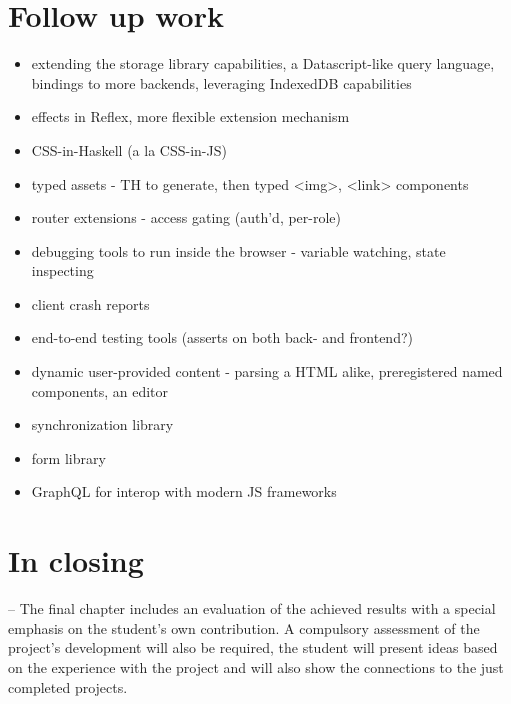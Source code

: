 \documentclass[english,odsaz]{fitthesis}
\begin{document}
\section{Follow up work}
\label{sec:org9b26072}
\begin{itemize}
\item extending the storage library capabilities, a Datascript-like query language,
bindings to more backends, leveraging IndexedDB capabilities
\item effects in Reflex, more flexible extension mechanism
\item CSS-in-Haskell (a la CSS-in-JS)
\item typed assets - TH to generate, then typed <img>, <link> components
\item router extensions - access gating (auth'd, per-role)
\item debugging tools to run inside the browser - variable watching, state inspecting
\item client crash reports
\item end-to-end testing tools (asserts on both back- and frontend?)
\item dynamic user-provided content - parsing a HTML alike, preregistered named
components, an editor
\item synchronization library
\item form library
\item GraphQL for interop with modern JS frameworks
\end{itemize}

\section{In closing}
\label{sec:org7d3e43d}
-- The final chapter includes an evaluation of the achieved results with a special
emphasis on the student's own contribution. A compulsory assessment of the
project's development will also be required, the student will present ideas
based on the experience with the project and will also show the connections to
the just completed projects. \cite{Pravidla}

\makeatletter
\def\@openbib@code{\addcontentsline{toc}{chapter}{Bibliography}}
\makeatother


\begin{flushleft}

\end{flushleft}
\iftwoside\cleardoublepage\fi
\end{document}
